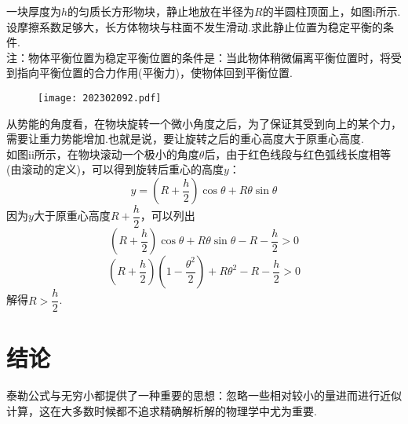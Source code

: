 \begin{example} \cite{xnlljbsi}
	一块厚度为$h$的匀质长方形物块，静止地放在半径为$R$的半圆柱顶面上，如图i所示.设摩擦系数足够大，长方体物块与柱面不发生滑动.求此静止位置为稳定平衡的条件. \\
	注：物体平衡位置为稳定平衡位置的条件是：当此物体稍微偏离平衡位置时，将受到指向平衡位置的合力作用(平衡力)，使物体回到平衡位置.
	
	\begin{figure}[htbp]
		\begin{center}
			\texttt{[image: 202302092.pdf]}
		\end{center}
	\caption{}
	\end{figure}
\end{example}
\begin{solution}
	从势能的角度看，在物块旋转一个微小角度之后，为了保证其受到向上的某个力，需要让重力势能增加.也就是说，要让旋转之后的重心高度大于原重心高度. \\
	如图ii所示，在物块滚动一个极小的角度$\theta$后，由于红色线段与红色弧线长度相等(由滚动的定义)，可以得到旋转后重心的高度$y$：
	$$y = (R+ \frac{h}{2})\cos \theta + R\theta \sin \theta$$
	因为$y$大于原重心高度$R + \dfrac{h}{2}$，可以列出$$(R+ \frac{h}{2})\cos \theta + R\theta \sin \theta - R - \frac{h}{2} > 0$$
	$$(R+ \frac{h}{2})(1-\frac{\theta ^2}{2}) + R\theta ^2 - R - \frac{h}{2} > 0$$
	解得$R>\dfrac{h}{2}$.
\end{solution}







\chapter*{结\quad 论}

泰勒公式与无穷小都提供了一种重要的思想：忽略一些相对较小的量进而进行近似计算，这在大多数时候都不追求精确解析解的物理学中尤为重要.
